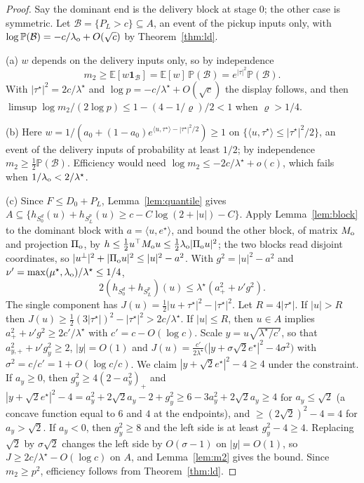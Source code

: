 \documentclass[11pt]{article}
\theoremstyle{definition}
\theoremstyle{remark}
\newcommand{\E}{\mathbb{E}}
\renewcommand{\P}{\mathbb{P}}
\newcommand{\one}{\mathbf{1}}
\newcommand{\ip}[2]{\langle #1,#2\rangle}
\begin{document}
\begin{proof}
Say the dominant end is the delivery block at stage $0$; the other case is symmetric. Let
$\mathcal{B}=\{P_L>c\}\subseteq A$, an event of the pickup inputs only, with
$\log\P(\mathcal{B})=-c/\lambda_{\rm o}+O(\sqrt c)$ by Theorem~\ref{thm:ld}.

(a) $w$ depends on the delivery inputs only, so by independence
\[
m_2\ge\E[w\one_{\mathcal{B}}]=\E[w]\,\P(\mathcal{B})=e^{|\tau|^2}\P(\mathcal{B}).
\]
With $|\tau^\star|^2=2c/\lambda^\star$
and $\log p=-c/\lambda^\star+O(\sqrt c)$ the display follows, and then
$\limsup\log m_2/(2\log p)\le1-(4-1/\varrho)/2<1$ when $\varrho>1/4$.

(b) Here $w=1/(a_0+(1-a_0)e^{\ip u{\tau^\star}-|\tau^\star|^2/2})\ge1$ on
$\{\ip u{\tau^\star}\le|\tau^\star|^2/2\}$, an event of the delivery inputs of probability at
least $1/2$; by independence $m_2\ge\frac12\P(\mathcal{B})$. Efficiency would need
$\log m_2\le-2c/\lambda^\star+o(c)$, which fails when $1/\lambda_{\rm o}<2/\lambda^\star$.

(c) Since $F\le D_0+P_L$, Lemma~\ref{lem:quantile} gives
$A\subseteq\{h_{S^d_0}(u)+h_{S^p_L}(u)\ge c-C\log(2+|u|)-C\}$. Apply Lemma~\ref{lem:block}
to the dominant block with $a=\ip u{e^\star}$, and bound the other block, of matrix
$M_{\rm o}$ and projection $\Pi_{\rm o}$, by
$h\le\frac12u^\top M_{\rm o}u\le\frac12\lambda_{\rm o}|\Pi_{\rm o}u|^2$; the two blocks read
disjoint coordinates, so $|u^\perp|^2+|\Pi_{\rm o}u|^2\le|u|^2-a^2$. With $g^2=|u|^2-a^2$ and
$\nu'=\max(\mu^\star,\lambda_{\rm o})/\lambda^\star\le1/4$,
\[
2(h_{S^d_0}+h_{S^p_L})(u)\le\lambda^\star(a_+^2+\nu'g^2).
\]
The single component has $J(u)=\frac12|u+\tau^\star|^2-|\tau^\star|^2$. Let $R=4|\tau^\star|$. If
$|u|>R$ then $J(u)\ge\frac12(3|\tau^\star|)^2-|\tau^\star|^2>2c/\lambda^\star$. If $|u|\le R$,
then $u\in A$ implies $a_+^2+\nu'g^2\ge2c'/\lambda^\star$ with $c'=c-O(\log c)$. Scale
$y=u\sqrt{\lambda^\star/c'}$, so that $a_{y,+}^2+\nu'g_y^2\ge2$, $|y|=O(1)$ and
$J(u)=\frac{c'}{2\lambda^\star}\big(|y+\sigma\sqrt2e^\star|^2-4\sigma^2\big)$ with
$\sigma^2=c/c'=1+O(\log c/c)$. We claim $|y+\sqrt2e^\star|^2-4\ge4$ under the
constraint. If $a_y\ge0$, then $g_y^2\ge4(2-a_y^2)_+$ and
$|y+\sqrt2e^\star|^2-4=a_y^2+2\sqrt2a_y-2+g_y^2\ge6-3a_y^2+2\sqrt2a_y\ge4$ for
$a_y\le\sqrt2$ (a concave function equal to $6$ and $4$ at the endpoints), and
$\ge(2\sqrt2)^2-4=4$ for $a_y>\sqrt2$. If $a_y<0$, then $g_y^2\ge8$ and the left side is
at least $g_y^2-4\ge4$. Replacing $\sqrt2$ by $\sigma\sqrt2$ changes the left side by
$O(\sigma-1)$ on $|y|=O(1)$, so $J\ge2c/\lambda^\star-O(\log c)$ on $A$, and
Lemma~\ref{lem:m2} gives the bound. Since $m_2\ge p^2$, efficiency follows from
Theorem~\ref{thm:ld}.
\end{proof}
\end{document}
